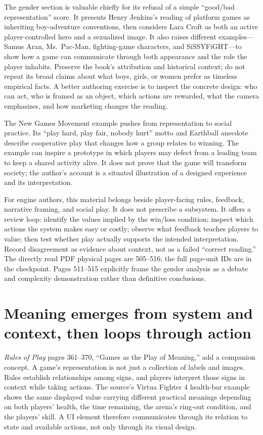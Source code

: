 The gender section is valuable chiefly for its refusal of a simple ``good/bad representation'' score. It presents Henry Jenkins's reading of platform games as inheriting boy-adventure conventions, then considers Lara Croft as both an active player-controlled hero and a sexualized image. It also raises different examples---Samus Aran, Ms.~Pac-Man, fighting-game characters, and SiSSYFiGHT---to show how a game can communicate through both appearance and the role the player inhabits. Preserve the book's attribution and historical context; do not repeat its broad claims about what boys, girls, or women prefer as timeless empirical facts. A better authoring exercise is to inspect the concrete design: who can act, who is framed as an object, which actions are rewarded, what the camera emphasizes, and how marketing changes the reading.

The New Games Movement example pushes from representation to social practice. Its ``play hard, play fair, nobody hurt'' motto and Earthball anecdote describe cooperative play that changes how a group relates to winning. The example can inspire a prototype in which players may defect from a leading team to keep a shared activity alive. It does not prove that the game will transform society; the author's account is a situated illustration of a designed experience and its interpretation.

For engine authors, this material belongs beside player-facing rules, feedback, narrative framing, and social play. It does not prescribe a subsystem. It offers a review loop: identify the values implied by the win/loss condition; inspect which actions the system makes easy or costly; observe what feedback teaches players to value; then test whether play actually supports the intended interpretation. Record disagreement as evidence about context, not as a failed ``correct reading.'' The directly read PDF physical pages are 505--516; the full page-unit IDs are in the checkpoint. Pages 511--515 explicitly frame the gender analysis as a debate and complexity demonstration rather than definitive conclusions.

\section{Meaning emerges from system and context, then loops through action}\label{06-engine-ii-ch046-meaning-emerges-from-system-and-context-then-loops-through-action}

\emph{Rules of Play} pages 361--370, ``Games as the Play of Meaning,'' add a companion concept. A game's representation is not just a collection of labels and images. Rules establish relationships among signs, and players interpret those signs in context while taking actions. The source's Virtua Fighter 4 health-bar example shows the same displayed value carrying different practical meanings depending on both players' health, the time remaining, the arena's ring-out condition, and the players' skill. A UI element therefore communicates through its relation to state and available actions, not only through its visual design.

